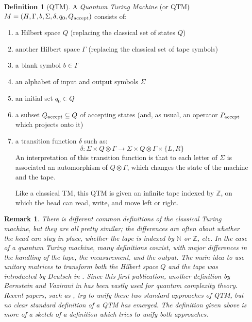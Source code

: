 \documentclass[12pt,a4paper]{article}
\theoremstyle{plain}
\newtheorem*{remark}{Remark}
\theoremstyle{definition}
\newtheorem*{definition}{Definition}
\begin{document}
\begin{definition}[QTM] A \emph{Quantum Turing Machine} (or QTM) $M = (H, \Gamma, b, \Sigma, \delta, q_0, Q_{\textnormal{accept}})$ consists of:
\begin{enumerate}[label=--, noitemsep]
    \item a Hilbert space $Q$ (replacing the classical set of states $Q$)
    \item another Hilbert space $\Gamma$ (replacing the classical set of tape symbols)
    \item a blank symbol $b\in \Gamma$
    \item an alphabet of input and output symbols $\Sigma$
    \item an initial set $q_0\in Q$
    \item a subset $Q_{\textnormal{accept}}\subseteq Q$ of accepting states (and, as usual, an operator $P_{\textnormal{accept}}$ which projects onto it)
    \item a transition function $\delta$ such as:
    \begin{equation*}
        \delta : \Sigma \times Q\otimes \Gamma \to \Sigma \times Q\otimes \Gamma \times \{L, R\}
    \end{equation*}
    An interpretation of this transition function is that to each letter of $\Sigma$ is associated an automorphism of $Q\otimes \Gamma$, which changes the state of the machine and the tape. 

    Like a classical TM, this QTM is given an infinite tape indexed by $\mathbb{Z}$, on which the head can read, write, and move left or right.

\end{enumerate}

\begin{remark}
    There is different common definitions of the classical Turing machine, but they are all pretty similar; the differences are often about whether the head can stay in place, whether the tape is indexed by $\mathbb{N}$ or $\mathbb{Z}$, etc. In the case of a quantum Turing machine, many definitions coexist, with major differences in the handling of the tape, the measurement, and the output. The main idea to use unitary matrices to transform both the Hilbert space $Q$ and the tape was introducted by Deutsch in \cite{deutsch-qtm}. Since this first publication, another definition by Bernstein and Vazirani in \cite{qc-theory-bernstein} has been vastly used for quantum complexity theory. Recent papers, such as \cite{guerrini}, try to unify these two standard approaches of QTM, but no clear standard definition of a QTM has emerged. The definition given above is more of a sketch of a definition which tries to unify both approaches.
\end{remark}

\end{definition}
\end{document}
